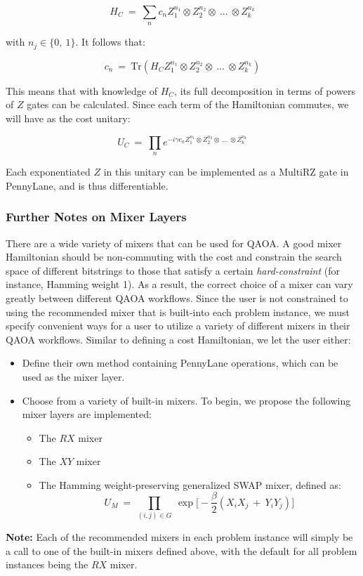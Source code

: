 \documentclass{article}
\begin{document}
$$H_C \ = \ \displaystyle\sum_{n} c_n Z_1^{n_1} \otimes Z_2^{n_2} \otimes \ ... \ \otimes Z_{k}^{n_k}$$

\noindent
with $n_j \in \{0, \ 1\}$. It follows that:

$$c_n \ = \ \text{Tr}( H_C Z_1^{n_1} \otimes Z_2^{n_2} \otimes \ ... \ \otimes Z_{k}^{n_k})$$

\noindent
This means that with knowledge of $H_C$, its full decomposition in terms of powers 
of $Z$ gates can be calculated. Since each term of the Hamiltonian commutes, we 
will have as the cost unitary:

$$U_C \ = \ \displaystyle\prod_{n} e^{- i \gamma c_n Z_1^{n_1} \otimes Z_2^{n_2} \otimes \ ... \ \otimes Z_{k}^{n_k}}$$

\noindent
Each exponentiated $Z$ in this unitary can be implemented as a MultiRZ gate in
PennyLane, and is thus differentiable.

\subsubsection{Further Notes on Mixer Layers}

There are a wide variety of mixers that can be used for QAOA. A good mixer 
Hamiltonian should be non-commuting with the cost and constrain the search space of different bitstrings 
to those that satisfy a certain \textit{hard-constraint} (for instance, Hamming weight 1). As a result, the correct 
choice of a mixer can vary greatly between different QAOA workflows.
\newline\newline
\noindent
Since the user is not constrained to using the recommended mixer that is built-into each 
problem instance, we must specify convenient ways for a user to utilize a variety of different 
mixers in their QAOA workflows.
\newline\newline
\noindent
Similar to defining a cost Hamiltonian, we let the user either: 
\begin{itemize}
	\item Define their own method 
	      containing PennyLane operations, which 
	      can be used as the mixer layer. 
	\item Choose from a variety of built-in mixers.
              To begin, we propose the following mixer layers are implemented:

		\begin{itemize}
			\item The $RX$ mixer
			\item The $XY$ mixer
			\item The Hamming weight-preserving generalized SWAP mixer, defined as:
				$$U_M \ = \ \displaystyle\prod_{(i, j) \in G} \ \exp \Big[ - \frac{\beta}{2} (X_{i} X_{j} \ + \ Y_{i} Y_{j}) \Big]$$
		\end{itemize}
\end{itemize}
\noindent
\textbf{Note:} Each of the recommended mixers in each problem instance will simply be a call 
to one of the built-in mixers defined above, with the default for all problem instances
being the $RX$ mixer.
\end{document}
